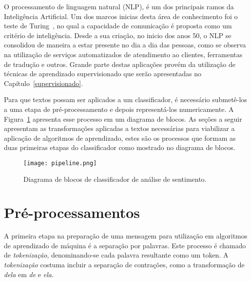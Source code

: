 O processamento de linguagem natural (NLP), é um dos principais ramos da Inteligência Artificial.
Um dos marcos inicias desta área de conhecimento foi o teste de Turing~\cite{turing50}, no qual a capacidade
de comunicação é proposta como um critério de inteligência.
Desde a sua criação, no inicio dos anos 50, o NLP se consolidou de maneira a estar presente no dia a dia das pessoas,
como se observa na utilização de serviços automatizados de atendimento ao clientes, ferramentas de tradução e outros.
Grande parte destas aplicações provém da utilização de técnicas de aprendizado supervisionado que serão apresentadas
no Capítulo~\ref{supervisionado}.

Para que textos possam ser aplicados a um classificador, é necessário submetê-los a uma etapa de pré-processamento e
depois representá-los numericamente.
A Figura~\ref{fig:pipeline} apresenta esse processo em um diagrama de blocos.
As seções a seguir apresentam as transformações aplicadas a textos necessárias para viabilizar a aplicação de algoritmos
de aprendizado, estes são os processos que formam as duas primeiras etapas do classificador como mostrado no diagrama de
blocos.

\begin{figure}
\begin{center} {
    \begin{center}
    \texttt{[image: pipeline.png]}
    \caption{Diagrama de blocos de classificador de análise de sentimento.}
    \label{fig:pipeline}
    \end{center}
}
\end{center}
\end{figure}

\section{Pré-processamentos}

A primeira etapa na preparação de uma mensagem para utilização em algoritmos de aprendizado de máquina é a separação por
palavras.
Este processo é chamado de \textit{tokenização}, denominando-se cada palavra resultante como um token.
A \textit{tokenização} costuma incluir a separação de contrações, como a transformação de \textit{dela} em \textit{de}
e \textit{ela}.



